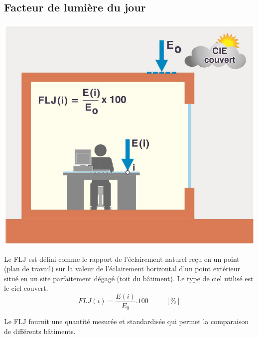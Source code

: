 \documentclass[11pt]{report}
\begin{document}
\subsection{Facteur de lumière du jour}
\begin{minipage}{0.4\linewidth}
\centering
\includegraphics[scale=0.35]{flj}
\end{minipage}
\begin{minipage}{0.6\linewidth}
Le FLJ est défini comme le rapport de l'éclairement naturel reçu en un point (plan de travail) sur la valeur de l'éclairement horizontal d'un point extérieur situé en un site parfaitement dégagé (toit du bâtiment). Le type de ciel utilisé est le ciel couvert.
$$FLJ(i) = \frac{E(i)}{E_0}.100 \;\;\;\;\;\;\;\;\;[\%]$$

Le FLJ fournit une quantité mesurée et standardisée qui permet la comparaison de différents bâtiments.
\end{minipage}
\end{document}
